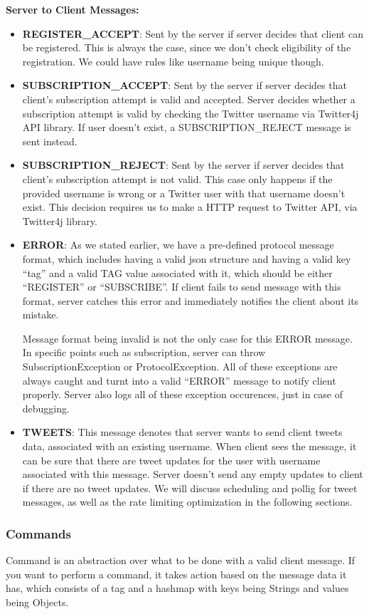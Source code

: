 \documentclass{article}
\begin{document}
\textbf{Server to Client Messages:}
\begin{itemize}
  \item \textbf{REGISTER\_ACCEPT}: Sent by the server if server decides that client can be registered. This is always the case, since we don't check eligibility of the registration. We could have rules like username being unique though.
  \item \textbf{SUBSCRIPTION\_ACCEPT}: Sent by the server if server decides that client's subscription attempt is valid and accepted. Server decides whether a subscription attempt is valid by checking the Twitter username via Twitter4j API library. If user doesn't exist, a SUBSCRIPTION\_REJECT message is sent instead.
  \item \textbf{SUBSCRIPTION\_REJECT}: Sent by the server if server decides that client's subscription attempt is not valid. This case only happens if the provided username is wrong or a Twitter user with that username doesn't exist. This decision requires us to make a HTTP request to Twitter API, via Twitter4j library.
  \item \textbf{ERROR}: As we stated earlier, we have a pre-defined protocol message format, which includes having a valid json structure and having a valid key ``tag'' and a valid TAG value associated with it, which should be either ``REGISTER'' or ``SUBSCRIBE''. If client fails to send message with this format, server catches this error and immediately notifies the client about its mistake.
    \par Message format being invalid is not the only case for this ERROR message. In specific points such as subscription, server can throw SubscriptionException or ProtocolException. All of these exceptions are always caught and turnt into a valid ``ERROR'' message to notify client properly. Server also logs all of these exception occurences, just in case of debugging.
  \item \textbf{TWEETS}: This message denotes that server wants to send client tweets data, associated with an existing username. When client sees the message, it can be sure that there are tweet updates for the user with username associated with this message. Server doesn't send any empty updates to client if there are no tweet updates. We will discuss scheduling and pollig for tweet messages, as well as the rate limiting optimization in the following sections.
\end{itemize}

\subsubsection{Commands}
\label{commands}
Command is an abstraction over what to be done with a valid client message. If you want to perform a command, it takes action based on the message data it has, which consists of a tag and a hashmap with keys being Strings and values being Objects.
\end{document}

